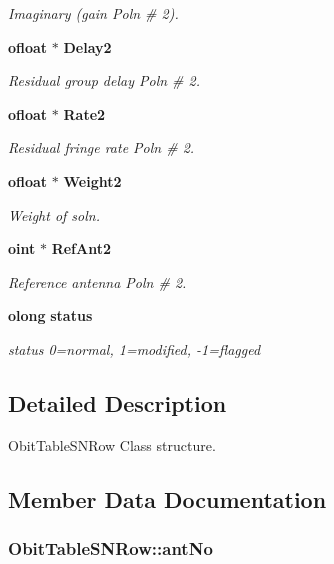 \begin{CompactItemize}
\begin{CompactList}\small\item\em Imaginary (gain Poln \# 2). \item\end{CompactList}\item 
{\bf ofloat} $\ast$ {\bf Delay2}
\begin{CompactList}\small\item\em Residual group delay Poln \# 2. \item\end{CompactList}\item 
{\bf ofloat} $\ast$ {\bf Rate2}
\begin{CompactList}\small\item\em Residual fringe rate Poln \# 2. \item\end{CompactList}\item 
{\bf ofloat} $\ast$ {\bf Weight2}
\begin{CompactList}\small\item\em Weight of soln. \item\end{CompactList}\item 
{\bf oint} $\ast$ {\bf Ref\-Ant2}
\begin{CompactList}\small\item\em Reference antenna Poln \# 2. \item\end{CompactList}\item 
{\bf olong} {\bf status}
\begin{CompactList}\small\item\em status 0=normal, 1=modified, -1=flagged \item\end{CompactList}\end{CompactItemize}


\subsection{Detailed Description}
Obit\-Table\-SNRow Class structure. 



\subsection{Member Data Documentation}
\subsubsection{ {\bf Obit\-Table\-SNRow::ant\-No}}\label{structObitTableSNRow_o9}


